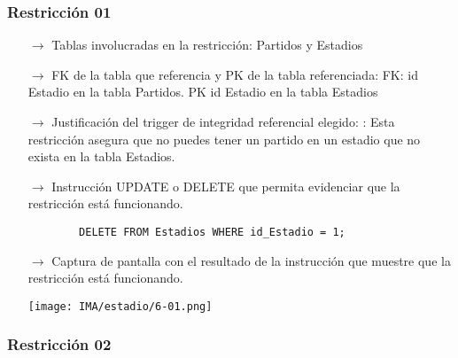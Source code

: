 \subsubsection*{Restricción 01}

\begin{itemize}
    \item[$\rightarrow$] Tablas involucradas en la restricción: Partidos y Estadios
    \item[$\rightarrow$] FK de la tabla que referencia y PK de la tabla referenciada: FK: id Estadio en la tabla Partidos. PK id Estadio en la tabla Estadios
    \item[$\rightarrow$] Justificación del trigger de integridad referencial elegido: : Esta restricción asegura que no puedes tener un partido en un estadio que no exista en la tabla Estadios.
    \item[$\rightarrow$] Instrucción UPDATE o DELETE que permita evidenciar que la restricción está
    funcionando.
    \begin{verbatim}
        DELETE FROM Estadios WHERE id_Estadio = 1;
    \end{verbatim}
    \item[$\rightarrow$] Captura de pantalla con el resultado de la instrucción que muestre que la restricción está
    funcionando.
    \begin{center}
        \texttt{[image: IMA/estadio/6-01.png]}
    \end{center}
\end{itemize}


\subsubsection*{Restricción 02}

